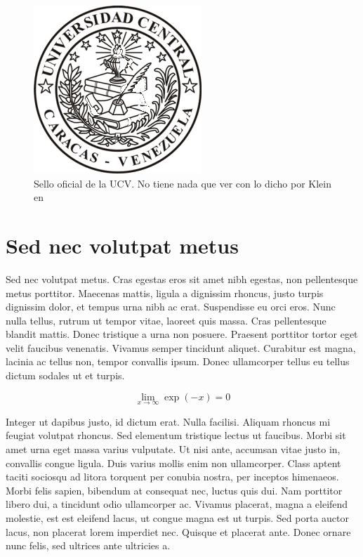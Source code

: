 \begin{figure}
\begin{center}
\includegraphics[scale=1]{EFUCVtesis/logoucvgifpeq.png}
\caption[Sello oficial de la UCV]{Sello oficial de la UCV. No tiene nada que ver con lo dicho por Klein en \cite{blackholes} \label{selloUCV}}
\end{center}
\end{figure}

\section{Sed nec volutpat metus}
Sed nec volutpat metus. Cras egestas eros sit amet nibh egestas, non pellentesque metus porttitor. Maecenas mattis, ligula a dignissim rhoncus, justo turpis dignissim dolor, et tempus urna nibh ac erat. Suspendisse eu orci eros. Nunc nulla tellus, rutrum ut tempor vitae, laoreet quis massa. Cras pellentesque blandit mattis. Donec tristique a urna non posuere. Praesent porttitor tortor eget velit faucibus venenatis. Vivamus semper tincidunt aliquet. Curabitur est magna, lacinia ac tellus non, tempor convallis ipsum. Donec ullamcorper tellus eu tellus dictum sodales ut et turpis.

\begin{equation}
	\lim_{x \to \infty} \exp(-x) = 0
\end{equation}

Integer ut dapibus justo, id dictum erat. Nulla facilisi. Aliquam rhoncus mi feugiat volutpat rhoncus. Sed elementum tristique lectus ut faucibus. Morbi sit amet urna eget massa varius vulputate. Ut nisi ante, accumsan vitae justo in, convallis congue ligula. Duis varius mollis enim non ullamcorper. Class aptent taciti sociosqu ad litora torquent per conubia nostra, per inceptos himenaeos. Morbi felis sapien, bibendum at consequat nec, luctus quis dui. Nam porttitor libero dui, a tincidunt odio ullamcorper ac. Vivamus placerat, magna a eleifend molestie, est est eleifend lacus, ut congue magna est ut turpis. Sed porta auctor lacus, non placerat lorem imperdiet nec. Quisque et placerat ante. Donec ornare nunc felis, sed ultrices ante ultricies a. 

